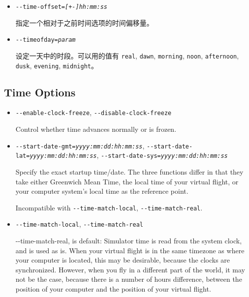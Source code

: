 \begin{itemize}
{\begin{itemize}
{-$ $-time-match-local} 选项可以解决这个系统本地时间与虚拟飞行的时差问题，将你的本地系统时间与虚拟飞行的时间同步。

 不可与 \texttt{-$ $-start-date-gmt}, \texttt{-$ $-start-date-lat}, \texttt{-$ $-start-date-sys} 选项同时启用。

\item{\texttt{-$ $-time-offset={\it [+-]hh:mm:ss}}}

  指定一个相对于之前时间选项的时间偏移量。

\item{\texttt{-$ $-timeofday={\it param}}}

  设定一天中的时段。可以用的值有 \texttt{real}, \texttt{dawn}, \texttt{morning},
  \texttt{noon}, \texttt{afternoon}, \texttt{dusk}, \texttt{evening}, \texttt{midnight}。
\end{itemize}
}
\fi
\iffalse
{
  \subsection{Time Options}
  \begin{itemize}

  \item{\texttt{-$ $-enable-clock-freeze}, \texttt{-$ $-disable-clock-freeze}}

  Control whether time advances normally or is frozen.

  \item{\texttt{-$ $-start-date-gmt={\it yyyy:mm:dd:hh:mm:ss}},
  \texttt{-$ $-start-date-lat={\it yyyy:mm:dd:hh:mm:ss}},
  \texttt{-$ $-start-date-sys={\it yyyy:mm:dd:hh:mm:ss}}}

  Specify the exact startup time/date. The three functions differ in that they
  take either Greenwich Mean Time, the local time of your virtual flight, or
  your computer system's local time as the reference point.

  Incompatible with \texttt{-$ $-time-match-local}, \texttt{-$ $-time-match-real}.

  \item{\texttt{-$ $-time-match-local}, \texttt{-$ $-time-match-real}}

  {-$ $-time-match-real}, is default: Simulator time is read from the system clock, and
  is used as is. When your virtual flight is in the same timezone as where your computer
  is located, this may be desirable, because the clocks are synchronized. However,
  when you fly in a different part of the world, it may not be the case, because there
  is a number of hours difference, between the position of your computer and the position of your
  virtual flight.


\end{itemize}}
\end{itemize}
